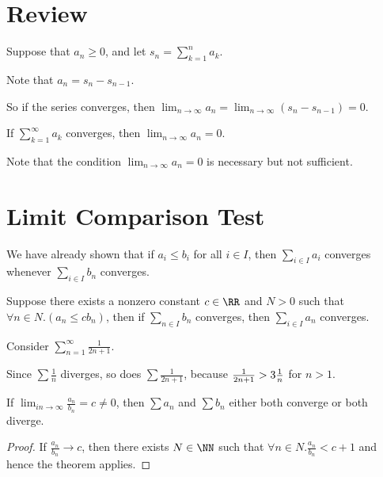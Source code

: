 \documentclass[11pt]{scrartcl}
\begin{document}
\section{Review}
Suppose that $a_n \geq 0$, and let $s_n = \sum _{k=1}^na_k$.

\begin{remark}
Note that $a_n= s_n-s_{n-1}$.

So if the series converges, then $\lim_{n\to \infty} a_n = \lim_{n\to\infty}(s_n- s_{n-1}) = 0$.
\end{remark}

\begin{theorem}
If $\sum_{k=1}^{\infty} a_{k}$ converges, then $\lim_{n\to \infty} a_n = 0$.
\end{theorem}
\begin{remark}
Note that the condition $\lim_{n\to\infty}a_n = 0$ is necessary but not sufficient.
\end{remark}
\section{Limit Comparison Test}

We have already shown that if $a_i\leq b_i$ for all $i\in I$, then
$\sum_{i\in I} a_{i}$ converges whenever $\sum_{i\in I}b_n$ converges.

\begin{theorem}
Suppose there exists a nonzero constant $c \in \RR$ and $N>0$ such
that $\forall n \in N.(a_n \leq c b_n)$, then if $\sum_{n\in I} b_{n}$
converges, then $\sum_{i\in I} a_{n}$ converges.

\end{theorem}

\begin{example}

Consider $\sum_{n=1}^{\infty}\frac{1}{2n+1}$. 

Since $\sum \frac{1}{n}$ diverges, so does $\sum \frac{1}{2n+1}$,
because $\frac{1}{2n+1}> 3 \* \frac{1}{n}$ for $n > 1$.
\end{example}

\begin{corollary}
 If $\lim_{in \to \infty} \frac{a_n}{b_n} = c \neq 0$, then $\sum a_n$ and $\sum b_{n}$ either both converge or both diverge.
\end{corollary}

\begin{proof}
  \hfill

If $\frac{a_n}{b_n} \to c$, then there exists $N\in\NN$ such that $\forall n\in N.\frac{a_n}{b_n} < c+1$ and hence the theorem applies.
\end{proof}
\end{document}
